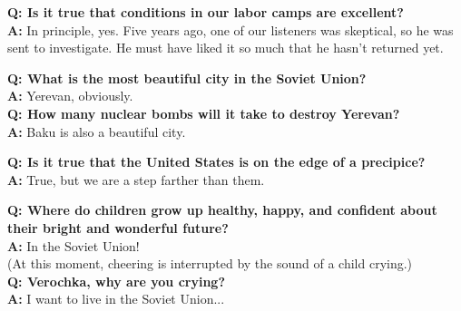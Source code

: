 {\medskip  
\textbf{Q: Is it true that conditions in our labor camps are excellent?} \\  
\textbf{A:} In principle, yes. Five years ago, one of our listeners was skeptical, so he was sent to investigate. He must have liked it so much that he hasn’t returned yet.  

\medskip  
\textbf{Q: What is the most beautiful city in the Soviet Union?} \\  
\textbf{A:} Yerevan, obviously.\\
\textbf{Q: How many nuclear bombs will it take to destroy Yerevan?} \\  
\textbf{A:} Baku is also a beautiful city.  

\medskip  
\textbf{Q: Is it true that the United States is on the edge of a precipice?} \\  
\textbf{A:} True, but we are a step farther than them.  

\medskip  
\medskip  
\textbf{Q: Where do children grow up healthy, happy, and confident about their bright and wonderful future?} \\  
\textbf{A:} In the Soviet Union!  
\\(At this moment, cheering is interrupted by the sound of a child crying.)\\
\textbf{Q: Verochka, why are you crying?} \\  
\textbf{A:} I want to live in the Soviet Union...  

}
